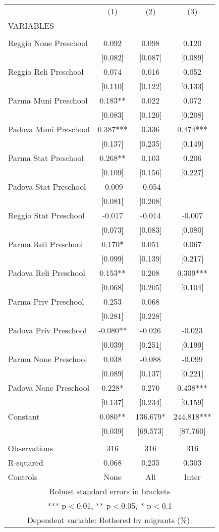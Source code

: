\begin{tabular}{lccc} \hline
 & (1) & (2) & (3) \\
VARIABLES &  &  &  \\ \hline
 &  &  &  \\
Reggio None Preschool & 0.092 & 0.098 & 0.120 \\
 & [0.082] & [0.087] & [0.089] \\
Reggio Reli Preschool & 0.074 & 0.016 & 0.052 \\
 & [0.110] & [0.122] & [0.133] \\
Parma Muni Preschool & 0.183** & 0.022 & 0.072 \\
 & [0.083] & [0.120] & [0.208] \\
Padova Muni Preschool & 0.387*** & 0.336 & 0.474*** \\
 & [0.137] & [0.235] & [0.149] \\
Parma Stat Preschool & 0.268** & 0.103 & 0.206 \\
 & [0.109] & [0.156] & [0.227] \\
Padova Stat Preschool & -0.009 & -0.054 &  \\
 & [0.081] & [0.208] &  \\
Reggio Stat Preschool & -0.017 & -0.014 & -0.007 \\
 & [0.073] & [0.083] & [0.080] \\
Parma Reli Preschool & 0.170* & 0.051 & 0.067 \\
 & [0.099] & [0.139] & [0.217] \\
Padova Reli Preschool & 0.153** & 0.208 & 0.309*** \\
 & [0.068] & [0.205] & [0.104] \\
Parma Priv Preschool & 0.253 & 0.068 &  \\
 & [0.281] & [0.228] &  \\
Padova Priv Preschool & -0.080** & -0.026 & -0.023 \\
 & [0.039] & [0.251] & [0.199] \\
Parma None Preschool & 0.038 & -0.088 & -0.099 \\
 & [0.089] & [0.137] & [0.221] \\
Padova None Preschool & 0.228* & 0.270 & 0.438*** \\
 & [0.137] & [0.234] & [0.159] \\
Constant & 0.080** & 136.679* & 244.818*** \\
 & [0.039] & [69.573] & [87.760] \\
 &  &  &  \\
Observations & 316 & 316 & 316 \\
R-squared & 0.068 & 0.235 & 0.303 \\
 Controls & None & All & Inter \\ \hline
\multicolumn{4}{c}{ Robust standard errors in brackets} \\
\multicolumn{4}{c}{ *** p$<$0.01, ** p$<$0.05, * p$<$0.1} \\
\multicolumn{4}{c}{ Dependent variable: Bothered by migrants (\%).} \\
\end{tabular}
